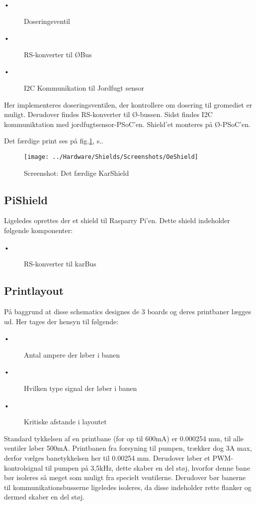 \begin{description}
 \item[•] Doseringsventil
 \item[•] RS-konverter til ØBus
 \item[•] I2C Kommunikation til Jordfugt sensor
\end{description}

Her implementeres doseringsventilen, der kontrollere om dosering til gromediet er muligt. Derudover findes RS-konverter til Ø-bussen. Sidst findes I2C kommuniktation med jordfugtsensor-PSoC'en. 
Shield'et monteres på Ø-PSoC'en.

Det færdige print ses på fig.\ref{screenshot:OeShield}, s.\pageref{screenshot:OeShield}.

\newpage
\begin{figure}[H]
	\centering
	\texttt{[image: ../Hardware/Shields/Screenshots/OeShield]}
	\caption{Screenshot: Det færdige KarShield}
	\label{screenshot:OeShield}
\end{figure}


\subsection{PiShield}

Ligeledes oprettes der et shield til Rasparry Pi'en. Dette shield indeholder følgende komponenter: 

\begin{description}
 \item[•] RS-konverter til karBus
\end{description}


\subsection{Printlayout}

På baggrund at disse schematics designes de 3 boards og deres printbaner lægges ud. Her tages der hensyn til følgende: 

\begin{description}
 \item[•] Antal ampere der løber i banen
 \item[•] Hvilken type signal der løber i banen
 \item[•] Kritiske afstande i layoutet
\end{description}

Standard tykkelsen af en printbane (for op til 600mA) er 0.000254 mm, til alle ventiler løber 500mA. Printbanen fra forsyning til pumpen, trækker dog 3A max, derfor vælges banetykkelsen her til 0.00254 mm. Derudover løber et PWM-kontrolsignal til pumpen på 3,5kHz, dette skaber en del støj, hvorfor denne bane bør isoleres så meget som muligt fra specielt ventilerne.
Derudover bør banerne til kommunikationsbusserne ligeledes isoleres, da disse indeholder rette flanker og dermed skaber en del støj. 